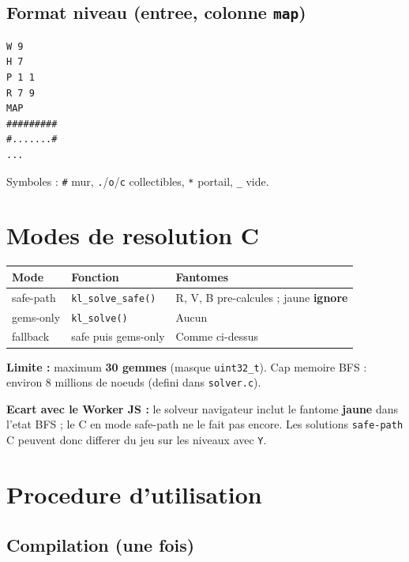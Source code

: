 \documentclass[11pt,a4paper]{article}
\begin{document}
\subsection{Format niveau (entree, colonne \texttt{map})}

\begin{lstlisting}[style=kllisting]
W 9
H 7
P 1 1
R 7 9
MAP
#########
#.......#
...
\end{lstlisting}

Symboles : \texttt{\#} mur, \texttt{.}/\texttt{o}/\texttt{c} collectibles, \texttt{*} portail, \texttt{\_} vide.

\section{Modes de resolution C}

\begin{table}[h]
\centering
\small
\begin{tabular}{@{}llp{6.5cm}@{}}
\toprule
\textbf{Mode} & \textbf{Fonction} & \textbf{Fantomes} \\
\midrule
safe-path & \texttt{kl\_solve\_safe()} & R, V, B pre-calcules ; jaune \textbf{ignore} \\
gems-only & \texttt{kl\_solve()} & Aucun \\
fallback & safe puis gems-only & Comme ci-dessus \\
\bottomrule
\end{tabular}
\end{table}

\textbf{Limite :} maximum \textbf{30 gemmes} (masque \texttt{uint32\_t}). Cap memoire BFS : environ 8 millions de noeuds (defini dans \texttt{solver.c}).

\textbf{Ecart avec le Worker JS :} le solveur navigateur inclut le fantome \textbf{jaune} dans l'etat BFS ; le C en mode safe-path ne le fait pas encore. Les solutions \texttt{safe-path} C peuvent donc differer du jeu sur les niveaux avec \texttt{Y}.

\section{Procedure d'utilisation}

\subsection{Compilation (une fois)}
\end{document}
